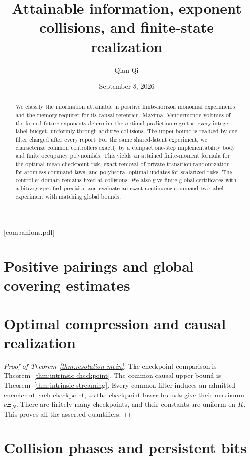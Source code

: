 
\providecommand{\upref}[2]{#1~\ref{#2}}
[companions.pdf]
\title[Attainable information and finite-state realization]{Attainable information, exponent collisions,
and finite-state realization}
\author{Qian Qi}
\date{September 8, 2026}

\begin{abstract}
We classify the information attainable in positive finite-horizon
monomial experiments and the memory required for its causal retention.
Maximal Vandermonde volumes of the formal future exponents determine
the optimal prediction regret at every integer label budget, uniformly
through additive collisions. The upper bound is realized by one filter
charged after every report. For the same shared-latent experiment, we
characterize common controllers exactly by a compact one-step
implementability body and finite occupancy polynomials. This yields an
attained finite-moment formula for the optimal mean checkpoint risk,
exact removal of private transition randomization for atomless command
laws, and polyhedral optimal updates for scalarized risks. The controller
domain remains fixed at collisions. We also give finite global
certificates with arbitrary specified precision and evaluate an exact
continuous-command two-label experiment with matching global bounds.
\end{abstract}
\maketitle






\section{Positive pairings and global covering estimates}
\label{sec:analytic-inputs}


\section{Optimal compression and causal realization}
\label{sec:direct-classification}

\begin{proof}[Proof of Theorem~\ref{thm:resolution-main}]
The checkpoint comparison is Theorem~\ref{thm:intrinsic-checkpoint}.
The common causal upper bound is Theorem~\ref{thm:intrinsic-streaming}.
Every common filter induces an admitted encoder at each checkpoint,
so the checkpoint lower bounds give their maximum $c\Xi_N$.
There are finitely many checkpoints, and their constants are uniform
on $K$. This proves all the asserted quantifiers.
\end{proof}
\section{Collision phases and persistent bits}
\label{sec:collision-phases}








